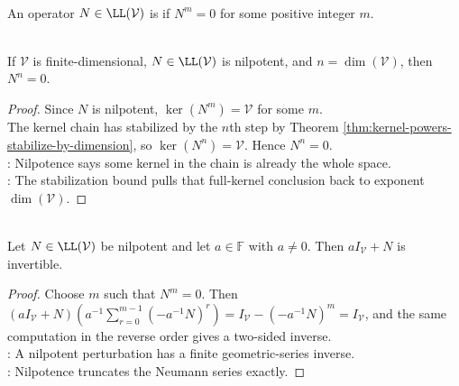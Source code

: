 \begin{definition} \label{def:nilpotent-operator} \\
An operator $N\in\LL(\mathcal{V})$ is  if $N^m=0$ for some positive integer $m$.
\end{definition}

\begin{corollary} \label{cor:nilpotent-power-dimension-zero} \\
If $\mathcal{V}$ is finite-dimensional, $N\in\LL(\mathcal{V})$ is nilpotent, and $n=\dim(\mathcal{V})$, then $N^n=0$.
\begin{proof}
Since $N$ is nilpotent, $\ker(N^m)=\mathcal{V}$ for some $m$.\\
The kernel chain has stabilized by the $n$th step by Theorem \ref{thm:kernel-powers-stabilize-by-dimension}, so $\ker(N^n)=\mathcal{V}$. Hence $N^n=0$.\\
: Nilpotence says some kernel in the chain is already the whole space.\\
: The stabilization bound pulls that full-kernel conclusion back to exponent $\dim(\mathcal{V})$.
\end{proof}
\end{corollary}

\begin{lemma} \label{lem:scalar-plus-nilpotent-invertible} \\
Let $N\in\LL(\mathcal{V})$ be nilpotent and let $a\in\mathbb{F}$ with $a\neq0$. Then $aI_{\mathcal{V}}+N$ is invertible.
\begin{proof}
Choose $m$ such that $N^m=0$. Then $(aI_{\mathcal{V}}+N)\left(a^{-1}\sum\limits_{r=0}^{m-1}(-a^{-1}N)^r\right) =I_{\mathcal{V}}-(-a^{-1}N)^m=I_{\mathcal{V}}$,
and the same computation in the reverse order gives a two-sided inverse.\\
: A nilpotent perturbation has a finite geometric-series inverse.\\
: Nilpotence truncates the Neumann series exactly.
\end{proof}
\end{lemma}

